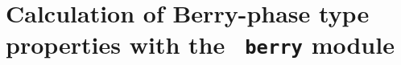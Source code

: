 \chapter{ Calculation of Berry-phase type properties with the {\tt
    berry} module}
\label{ch:berry}
